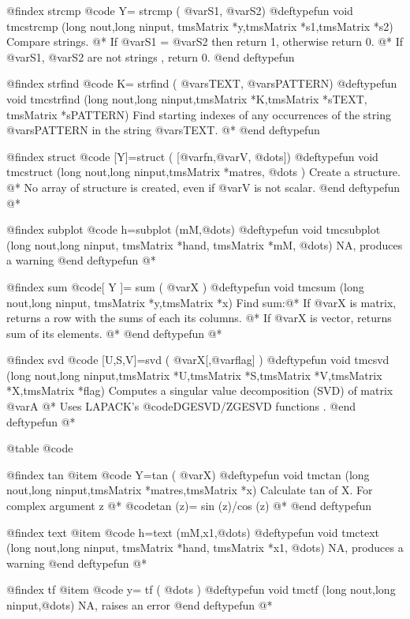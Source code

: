 @findex   strcmp
@code{  Y= strcmp ( @var{S1}, @var{S2})}
@deftypefun void tmcstrcmp  (long nout,long ninput, tmsMatrix *y,tmsMatrix *s1,tmsMatrix *s2)
Compare strings. @*  
If @var{S1} = @var{S2} then return 1, otherwise return 0. @*
If @var{S1}, @var{S2} are not strings , return 0.
@end deftypefun


@findex   strfind
@code{  K= strfind ( @var{sTEXT}, @var{sPATTERN})}
@deftypefun void tmcstrfind  (long nout,long ninput,tmsMatrix *K,tmsMatrix *sTEXT, tmsMatrix *sPATTERN)
Find starting indexes of any occurrences of the string @var{sPATTERN} in the string @var{sTEXT}. @*  
@end deftypefun


@findex  struct
@code{  [Y]=struct  (  [@var{fn},@var{V}, @dots{}])}
@deftypefun void tmcstruct  (long nout,long ninput,tmsMatrix *matres, @dots{} )
Create a structure. @*
No array of structure is created, even if @var{V} is not scalar.
@end deftypefun
@*

 


@findex  subplot
@code{ h=subplot (mM,@dots{}) }
@deftypefun void tmcsubplot  (long nout,long ninput, tmsMatrix *hand, tmsMatrix *mM, @dots{})
NA, produces a warning
@end deftypefun
@*


@findex sum
@code{[ Y ]= sum  ( @var{X}  ) }
@deftypefun void tmcsum  (long nout,long ninput, tmsMatrix *y,tmsMatrix *x) 
Find sum:@*
If  @var{X} is matrix,   returns a row with the sums of each its columns. @*
If  @var{X} is vector,   returns  sum of its elements. @*
@end deftypefun
@*


@findex   svd
@code{  [U,S,V]=svd ( @var{X}[,@var{flag}]  )    }
@deftypefun void tmcsvd (long nout,long ninput,tmsMatrix *U,tmsMatrix *S,tmsMatrix *V,tmsMatrix *X,tmsMatrix *flag)
Computes a singular value decomposition   (SVD) of     matrix     @var{A} @*
Uses LAPACK's @code{DGESVD/ZGESVD}  functions . 
@end deftypefun
@*


@table @code

@findex   tan
@item @code{  Y=tan ( @var{X})}
@deftypefun  void tmctan (long nout,long ninput,tmsMatrix *matres,tmsMatrix *x)
Calculate  tan of X. For complex argument z @*
  @code{tan (z)= sin (z)/cos (z)} @*
@end deftypefun


@findex  text
@item @code{ h=text (mM,x1,@dots{}) }
@deftypefun void tmctext  (long nout,long ninput, tmsMatrix *hand, tmsMatrix *x1, @dots{})
NA, produces a warning
@end deftypefun
@*


@findex  tf
@item @code{ y= tf  (   @dots{} )}
@deftypefun void tmctf  (long nout,long ninput,@dots{})
NA, raises  an error
@end deftypefun
@*


